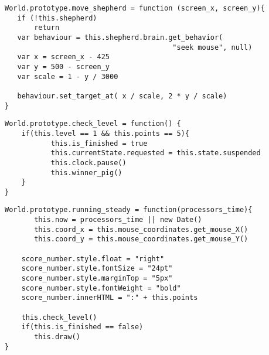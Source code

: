 \begin{lstlisting}[caption=Función move\_shepherd, label={lst:code441}]
World.prototype.move_shepherd = function (screen_x, screen_y){
   if (!this.shepherd)
       return
   var behaviour = this.shepherd.brain.get_behavior(
                                        "seek mouse", null)
   var x = screen_x - 425
   var y = 500 - screen_y
   var scale = 1 - y / 3000

   behaviour.set_target_at( x / scale, 2 * y / scale)
}
\end{lstlisting}


\begin{lstlisting}[caption=Función check\_level, label={lst:code442}]
World.prototype.check_level = function() {
    if(this.level == 1 && this.points == 5){
           this.is_finished = true
           this.currentState.requested = this.state.suspended
           this.clock.pause()
           this.winner_pig()
    }
}
\end{lstlisting}


\begin{lstlisting}[caption=Función running\_steady, label={lst:code443}]
World.prototype.running_steady = function(processors_time){
       this.now = processors_time || new Date()
       this.coord_x = this.mouse_coordinates.get_mouse_X()
       this.coord_y = this.mouse_coordinates.get_mouse_Y()

    score_number.style.float = "right"
    score_number.style.fontSize = "24pt"
    score_number.style.marginTop = "5px"
    score_number.style.fontWeight = "bold"
    score_number.innerHTML = ":" + this.points

    this.check_level()
    if(this.is_finished == false)
       this.draw()
}
\end{lstlisting}


